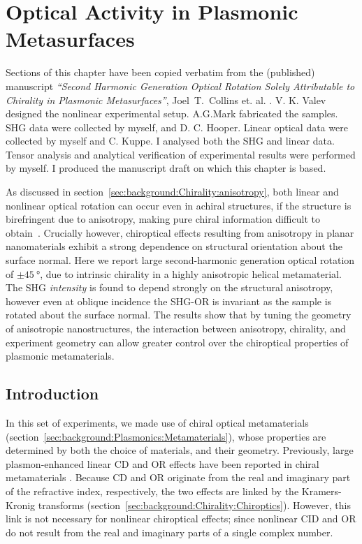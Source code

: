 \chapter{Optical Activity in Plasmonic Metasurfaces}\label{sec:results:OAinPlanarNanohelices}

Sections of this chapter have been copied verbatim from the (published) manuscript \textit{``Second Harmonic Generation Optical Rotation Solely Attributable to Chirality in Plasmonic Metasurfaces''}, Joel~T.~Collins et. al. \cite{Collins2018b}.
V. K. Valev designed the nonlinear experimental setup. A.G.Mark fabricated the samples. SHG data were collected by myself, and D. C. Hooper. Linear optical data were collected by myself and C. Kuppe. I analysed both the SHG and linear data. Tensor analysis and analytical verification of experimental results were performed by myself. I produced the manuscript draft on which this chapter is based.

\bigskip \noindent
As discussed in section~\ref{sec:background:Chirality:anisotropy}, both linear and nonlinear optical rotation can occur even in achiral structures, if the structure is birefringent due to anisotropy, making pure chiral information difficult to obtain~\cite{Hooper2017}. 
Crucially however, chiroptical effects resulting from anisotropy in planar nanomaterials exhibit a strong dependence on structural orientation about the surface normal.
Here we report large second-harmonic generation optical rotation of $\pm\SI{45}{\degree}$, due to intrinsic chirality in a highly anisotropic helical metamaterial. 
The SHG \emph{intensity} is found to depend strongly on the structural anisotropy, however even at oblique incidence the SHG-OR is invariant as the sample is rotated about the surface normal. 
The results show that by tuning the geometry of anisotropic nanostructures, the interaction between anisotropy, chirality, and experiment geometry can allow greater control over the chiroptical properties of plasmonic metamaterials.

\section{Introduction}\label{sec:results:OAinPlanarNanohelices:introduction}
In this set of experiments, we made use of chiral optical metamaterials (section~\ref{sec:background:Plasmonics:Metamaterials}), whose properties are determined by both the choice of materials, and their geometry. Previously, large plasmon-enhanced linear CD and OR effects have been reported in chiral metamaterials \cite{Decker2007, Papakostas2003, Kuwata-Gonokami2005a, Plum2007, Gansel2011}.
Because CD and OR originate from the real and imaginary part of the refractive index, respectively, the two effects are linked by the Kramers-Kronig transforms (section~\ref{sec:background:Chirality:Chiroptics}).
However, this link is not necessary for nonlinear chiroptical effects; since nonlinear CID and OR do not result from the real and imaginary parts of a single complex number.

